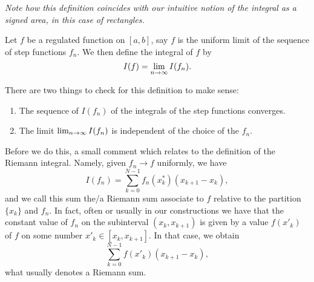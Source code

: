 \documentclass[10pt, a4paper]{article}
\begin{document}
\textit{Note how this definition coincides with our intuitive notion of the integral as a signed area,
in this case of rectangles.}

\begin{definition}
    Let $f$ be a regulated function on $[a, b]$,
    say $f$ is the uniform limit of the sequence of step functions $f_n$.
    We then define the integral of $f$ by
    \[
    I(f) = \lim_{n \rightarrow \infty} I(f_n).
    \]
\end{definition}
There are two things to check for this definition to make sense:
\begin{enumerate}[label = (\roman*)]
    \item The sequence of $I(f_n)$ of the integrals of the step functions converges.
    \item The limit $\lim_{n \rightarrow \infty} I(f_n)$ is independent of the choice of the $f_n$.
\end{enumerate}

Before we do this,
a small comment which relates to the definition of the Riemann integral.
Namely,
given $f_n \rightarrow f$ uniformly,
we have
\[
I(f_n) = \sum_{k = 0}^{N - 1}f_n(x_k ^ {*})(x_{k + 1} - x_k),
\]
and we call this sum the/a Riemann sum associate to $f$ relative to the partition $\{x_k\}$ and $f_n$.
In fact,
often or usually in our constructions we have that the constant value of $f_n$ on the subinterval $(x_k, x_{k + 1})$ is given by a value $f(x'_k)$ of $f$ on some number $x'_k \in [x_k, x_{k + 1}]$.
In that case,
we obtain
\[
\sum_{k = 0}^{N - 1}f(x'_k)(x_{k + 1} - x_k),
\]
what usually denotes a Riemann sum.
\end{document}
